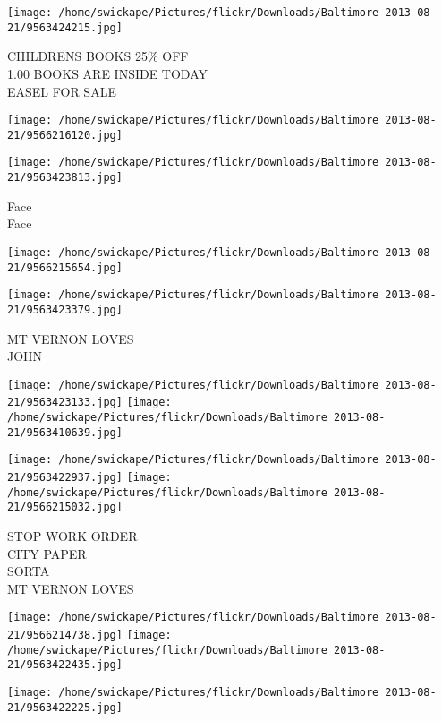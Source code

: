 \documentclass[10pt,letterpaper]{article}
\begin{document}
\texttt{[image: /home/swickape/Pictures/flickr/Downloads/Baltimore 2013-08-21/9563424215.jpg]}

CHILDRENS BOOKS 25\% OFF\\
1.00 BOOKS ARE INSIDE TODAY\\
EASEL FOR SALE\\
\pagebreak

\texttt{[image: /home/swickape/Pictures/flickr/Downloads/Baltimore 2013-08-21/9566216120.jpg]}

\vspace{0.25in}
\texttt{[image: /home/swickape/Pictures/flickr/Downloads/Baltimore 2013-08-21/9563423813.jpg]}

Face\\
Face\\
\pagebreak

\texttt{[image: /home/swickape/Pictures/flickr/Downloads/Baltimore 2013-08-21/9566215654.jpg]}

\vspace{0.25in}
\texttt{[image: /home/swickape/Pictures/flickr/Downloads/Baltimore 2013-08-21/9563423379.jpg]}

MT VERNON LOVES\\
JOHN\\
\pagebreak

\texttt{[image: /home/swickape/Pictures/flickr/Downloads/Baltimore 2013-08-21/9563423133.jpg]}
\texttt{[image: /home/swickape/Pictures/flickr/Downloads/Baltimore 2013-08-21/9563410639.jpg]}

\texttt{[image: /home/swickape/Pictures/flickr/Downloads/Baltimore 2013-08-21/9563422937.jpg]}
\texttt{[image: /home/swickape/Pictures/flickr/Downloads/Baltimore 2013-08-21/9566215032.jpg]}

STOP WORK ORDER\\
CITY PAPER\\
SORTA\\
MT VERNON LOVES\\
\pagebreak

\texttt{[image: /home/swickape/Pictures/flickr/Downloads/Baltimore 2013-08-21/9566214738.jpg]}
\texttt{[image: /home/swickape/Pictures/flickr/Downloads/Baltimore 2013-08-21/9563422435.jpg]}

\vspace{0.25in}
\texttt{[image: /home/swickape/Pictures/flickr/Downloads/Baltimore 2013-08-21/9563422225.jpg]}
\end{document}
